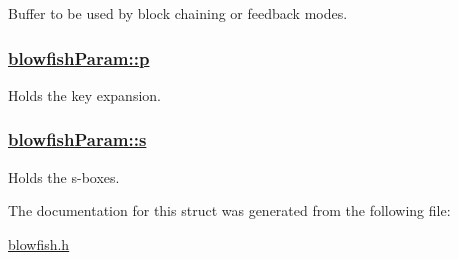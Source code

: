 Buffer to be used by block chaining or feedback modes. 

\hypertarget{structblowfishParam_o0}{
\subsubsection[p]{\setlength{\rightskip}{0pt plus 5cm}\hyperlink{structblowfishParam_o0}{blowfish\-Param::p}}}
\label{structblowfishParam_o0}


Holds the key expansion. 

\hypertarget{structblowfishParam_o1}{
\subsubsection[s]{\setlength{\rightskip}{0pt plus 5cm}\hyperlink{structblowfishParam_o1}{blowfish\-Param::s}}}
\label{structblowfishParam_o1}


Holds the s-boxes. 



The documentation for this struct was generated from the following file:\begin{CompactItemize}
\item 
\hyperlink{blowfish_8h}{blowfish.h}\end{CompactItemize}
